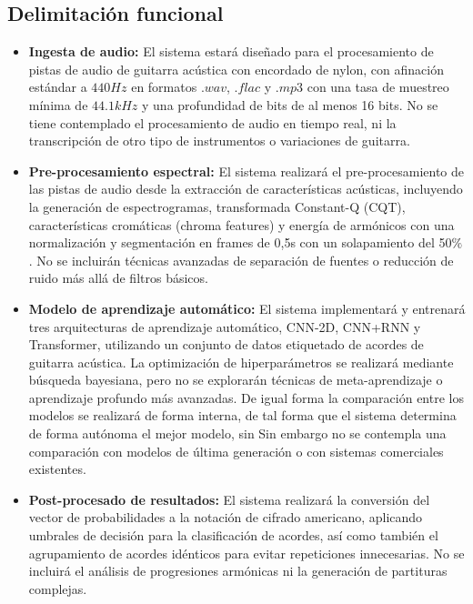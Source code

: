 \subsection{Delimitación funcional}
\begin{itemize}

\item \textbf{Ingesta de audio:} El sistema estará diseñado para el procesamiento de pistas de audio de guitarra acústica con encordado de nylon, con afinación estándar a $440 Hz$ en formatos $.wav$, $.flac$ y $.mp3$ con una tasa de muestreo mínima de $44.1 kHz$ y una profundidad de bits de al menos 16 bits. No se tiene contemplado el procesamiento de audio en tiempo real, ni la transcripción de otro tipo de instrumentos o variaciones de guitarra.

\item \textbf{Pre-procesamiento espectral:} El sistema realizará el pre-procesamiento de las pistas de audio desde la extracción de características acústicas, incluyendo la generación de espectrogramas, transformada Constant-Q (CQT), características cromáticas (chroma features) y energía de armónicos con una normalización y segmentación en frames de 0,5s con un solapamiento del 50$\%$. No se incluirán técnicas avanzadas de separación de fuentes o reducción de ruido más allá de filtros básicos.

\item \textbf{Modelo de aprendizaje automático:} El sistema implementará y entrenará tres arquitecturas de aprendizaje automático, CNN-2D, CNN+RNN y Transformer, utilizando un conjunto de datos etiquetado de acordes de guitarra acústica. La optimización de hiperparámetros se realizará mediante búsqueda bayesiana, pero no se explorarán técnicas de meta-aprendizaje o aprendizaje profundo más avanzadas. De igual forma la comparación entre los modelos se realizará de forma interna, de tal forma que el sistema determina de forma autónoma el mejor modelo, sin Sin embargo no se contempla una comparación con modelos de última generación o con sistemas comerciales existentes.

\item \textbf{Post-procesado de resultados:} El sistema realizará la conversión del vector de probabilidades a la notación de cifrado americano, aplicando umbrales de decisión para la clasificación de acordes, así como también el agrupamiento de acordes idénticos para evitar repeticiones innecesarias. No se incluirá el análisis de progresiones armónicas ni la generación de partituras complejas.

\end{itemize}